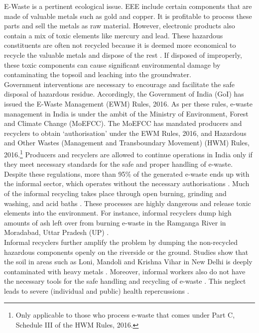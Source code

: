 \documentclass[a4paper, 12pt]{article}
\begin{document}
                    E-Waste is a pertinent ecological issue. EEE include certain components that are made of valuable metals such as gold and copper. It is profitable to process these parts and sell the metals as raw material. However, electronic products also contain a mix of toxic elements like mercury and lead. These hazardous constituents are often not recycled because it is deemed more economical to recycle the valuable metals and dispose of the rest \parencite{worstallnews}. If disposed of improperly, these toxic components can cause significant environmental damage by contaminating the topsoil and leaching into the groundwater. \\
                    
                    Government interventions are necessary to encourage and facilitate the safe disposal of hazardous residue. Accordingly, the Government of India (GoI) has issued the E-Waste Management (EWM) Rules, 2016. As per these rules, e-waste management in India is under the ambit of the Ministry of Environment, Forest and Climate Change (MoEFCC). The MoEFCC has mandated producers and recyclers to obtain ‘authorisation’ under the EWM Rules, 2016, and Hazardous and Other Wastes (Management and Transboundary Movement) (HWM) Rules, 2016.\footnote{Only applicable to those who process e-waste that comes under Part C, Schedule III of the HWM Rules, 2016.} Producers and recyclers are allowed to continue operations in India only if they meet necessary standards for the safe and proper handling of e-waste. \\
                     
                     Despite these regulations, more than 95\% of the generated e-waste ends up with the informal sector, which operates without the necessary authorisations \parencite{assochamstats}. Much of the informal recycling takes place through open burning, grinding and washing, and acid baths \parencite{csereport}. These processes are highly dangerous and release toxic elements into the environment. For instance, informal recyclers dump high amounts of ash left over from burning e-waste in the Ramganga River in Moradabad, Uttar Pradesh (UP) \parencite{csereport}. \\
                    
                    Informal recyclers further amplify the problem by dumping the non-recycled hazardous components openly on the riverside or the ground. Studies show that the soil in areas such as Loni, Mandoli and Krishna Vihar in New Delhi is deeply contaminated with heavy metals \parencite{toxicsreport, sahanews}. Moreover, informal workers also do not have the necessary tools for the safe handling and recycling of e-waste \parencite{kumarnews}. This neglect leads to severe (individual and public) health repercussions \parencite{bhowmicknews}. \\
                    
\end{document}
